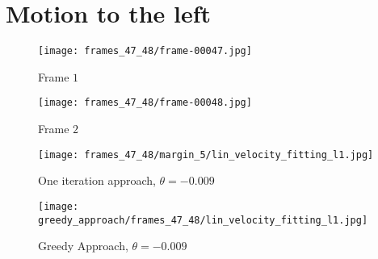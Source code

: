 \documentclass[
	fontsize=12pt,
	paper=a4,
	twoside=false,
	numbers=noenddot,
	plainheadsepline,
	toc=listof,
	toc=bibliography
]{scrartcl}
\begin{document}
  
\FloatBarrier
\newpage

\section*{Motion to the left}

\begin{minipage}{\linewidth}
      \centering
      \begin{minipage}{0.45\linewidth}
          \begin{figure}[H]
              \texttt{[image: frames\_47\_48/frame-00047.jpg]}
              \caption{Frame $1$}
          \end{figure}
      \end{minipage}
      \hspace{0.05\linewidth}
      \begin{minipage}{0.45\linewidth}
          \begin{figure}[H]
              \texttt{[image: frames\_47\_48/frame-00048.jpg]}
              \caption{Frame $2$}
          \end{figure}
      \end{minipage}
\end{minipage}
\FloatBarrier

\begin{minipage}{\linewidth}
      \centering
      \begin{minipage}{0.45\linewidth}
          \begin{figure}[H]
              \texttt{[image: frames\_47\_48/margin\_5/lin\_velocity\_fitting\_l1.jpg]}
              \caption{One iteration approach, $\theta = -0.009$}
          \end{figure}
      \end{minipage}
      \hspace{0.05\linewidth}
      \begin{minipage}{0.45\linewidth}
          \begin{figure}[H]
              \texttt{[image: greedy\_approach/frames\_47\_48/lin\_velocity\_fitting\_l1.jpg]}
              \caption{Greedy Approach, $\theta = -0.009$}
          \end{figure}
      \end{minipage}
\end{minipage}
\end{document}
